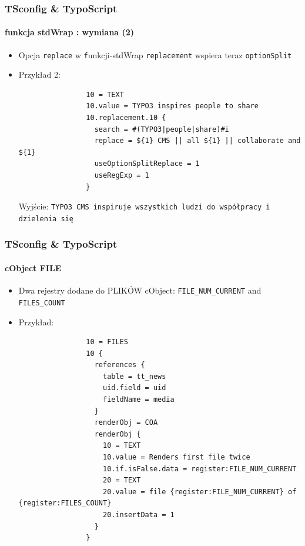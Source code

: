 
\begin{frame}[fragile]
	\frametitle{TSconfig \& TypoScript}
	\framesubtitle{funkcja stdWrap : wymiana (2)}

	\begin{itemize}
		\item Opcja \texttt{replace} w \texttt funkcji-{stdWrap} \texttt{replacement}\newline
			wspiera teraz \texttt{optionSplit}

		\item Przykład 2:

			\begin{lstlisting}
				10 = TEXT
				10.value = TYPO3 inspires people to share
				10.replacement.10 {
				  search = #(TYPO3|people|share)#i
				  replace = ${1} CMS || all ${1} || collaborate and ${1}
				  useOptionSplitReplace = 1
				  useRegExp = 1
				}
			\end{lstlisting}

			Wyjście:\newline
				\texttt{TYPO3 CMS inspiruje wszystkich ludzi do współpracy i dzielenia się}

	\end{itemize}

\end{frame}


\begin{frame}[fragile]
	\frametitle{TSconfig \& TypoScript}
	\framesubtitle{cObject FILE}

	\begin{itemize}
		\item Dwa rejestry dodane do PLIKÓW cObject:\newline
			\texttt{FILE\_NUM\_CURRENT} and \texttt{FILES\_COUNT}

		\item Przykład:

			\lstset{
				basicstyle=\tiny\ttfamily
			}

			\begin{lstlisting}
				10 = FILES
				10 {
				  references {
				    table = tt_news
				    uid.field = uid
				    fieldName = media
				  }
				  renderObj = COA
				  renderObj {
				    10 = TEXT
				    10.value = Renders first file twice
				    10.if.isFalse.data = register:FILE_NUM_CURRENT
				    20 = TEXT
				    20.value = file {register:FILE_NUM_CURRENT} of {register:FILES_COUNT}
				    20.insertData = 1
				  }
				}
			\end{lstlisting}

	\end{itemize}

\end{frame}

